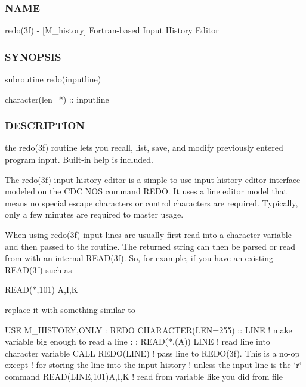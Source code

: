 \subsubsection*{N\+A\+ME}

redo(3f) -\/ \mbox{[}M\+\_\+history\mbox{]} Fortran-\/based Input History Editor 

\subsubsection*{S\+Y\+N\+O\+P\+S\+IS}

\begin{DoxyVerb}subroutine redo(inputline)

  character(len=*) :: inputline
\end{DoxyVerb}


\subsubsection*{D\+E\+S\+C\+R\+I\+P\+T\+I\+ON}

the redo(3f) routine lets you recall, list, save, and modify previously entered program input. Built-\/in help is included.

The redo(3f) input history editor is a simple-\/to-\/use input history editor interface modeled on the C\+DC N\+OS command R\+E\+DO. It uses a line editor model that means no special escape characters or control characters are required. Typically, only a few minutes are required to master usage.

When using redo(3f) input lines are usually first read into a character variable and then passed to the routine. The returned string can then be parsed or read from with an internal R\+E\+A\+D(3f). So, for example, if you have an existing R\+E\+A\+D(3f) such as

R\+E\+A\+D($\ast$,101) A,I,K

replace it with something similar to

U\+SE M\+\_\+\+H\+I\+S\+T\+O\+RY,O\+N\+LY \+: R\+E\+DO C\+H\+A\+R\+A\+C\+T\+ER(L\+EN=255) \+:\+: L\+I\+NE ! make variable big enough to read a line \+: \+: R\+E\+AD($\ast$,\textquotesingle{}(A)\textquotesingle{}) L\+I\+NE ! read line into character variable C\+A\+LL R\+E\+D\+O(\+L\+I\+N\+E) ! pass line to R\+E\+D\+O(3f). This is a no-\/op except ! for storing the line into the input history ! unless the input line is the \char`\"{}r\char`\"{} command R\+E\+A\+D(\+L\+I\+N\+E,101)A,I,K ! read from variable like you did from file

